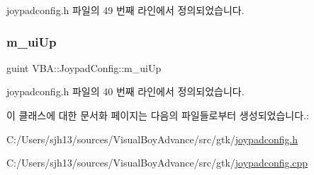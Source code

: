 joypadconfig.\+h 파일의 49 번째 라인에서 정의되었습니다.

\mbox{\label{class_v_b_a_1_1_joypad_config_a9cd889f0d74de1737b32e81b21a0f78d}} 
\subsubsection{\texorpdfstring{m\+\_\+ui\+Up}{m\_uiUp}}
{\footnotesize\ttfamily guint V\+B\+A\+::\+Joypad\+Config\+::m\+\_\+ui\+Up}



joypadconfig.\+h 파일의 40 번째 라인에서 정의되었습니다.



이 클래스에 대한 문서화 페이지는 다음의 파일들로부터 생성되었습니다.\+:\begin{DoxyCompactItemize}
\item 
C\+:/\+Users/sjh13/sources/\+Visual\+Boy\+Advance/src/gtk/\mbox{\hyperlink{joypadconfig_8h}{joypadconfig.\+h}}\item 
C\+:/\+Users/sjh13/sources/\+Visual\+Boy\+Advance/src/gtk/\mbox{\hyperlink{joypadconfig_8cpp}{joypadconfig.\+cpp}}\end{DoxyCompactItemize}
